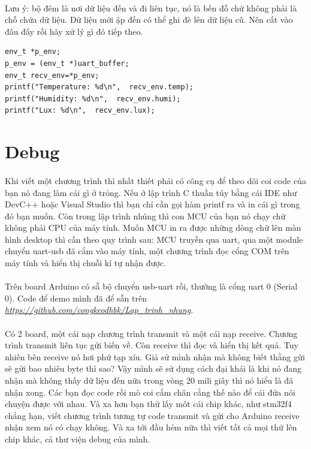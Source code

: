 \documentclass[12pt,a5paper]{book}
\begin{document}
\paragraph{}
Lưu ý: bộ đêm là nơi dữ liệu đến và đi liên tục, nó là bến đỗ chứ không phải là chỗ chứa dữ liệu. Dữ liệu mới ập đến có thể ghi đè lên dữ liệu cũ. Nên cất vào đâu đấy rồi hãy xử lý gì đó tiếp theo.
\begin{lstlisting}
env_t *p_env;
p_env = (env_t *)uart_buffer;
env_t recv_env=*p_env;
printf("Temperature: %d\n",  recv_env.temp);
printf("Humidity: %d\n",  recv_env.humi);
printf("Lux: %d\n",  recv_env.lux);
\end{lstlisting}
\section{Debug}
\paragraph{}
Khi viết một chương trình thì nhất thiết phải có công cụ để theo dõi coi code của bạn nó đang làm cái gì ở trỏng. Nếu ở lập trình C thuần túy bằng cái IDE như DevC++ hoặc Visual Studio thì bạn chỉ cần gọi hàm printf ra và in cái gì trong đó bạn muốn. Còn trong lập trình nhúng thì con MCU của bạn nó chạy chứ không phải CPU của máy tính. Muốn MCU in ra được những dòng chữ lên màn hình desktop thì cần theo quy trình sau: MCU truyền qua uart, qua một module chuyển uart-usb đã cắm vào máy tính, một chương trình đọc cổng COM trên máy tính và hiển thị chuỗi kí tự nhận được.
\paragraph{}
Trên board Arduino có sẵ bộ chuyển usb-uart rồi, thường là cổng uart 0 (Serial 0). Code để demo mình đã để sẵn trên \textit{\url{https://github.com/congkeodhbk/Lap_trinh_nhung}}. 
\paragraph{}
Có 2 board, một cái nạp chương trình transmit và một cái nạp receive. Chương trình transmit liên tục gửi biến về. Còn receive thì đọc và hiển thị kết quả. Tuy nhiên bên receive nó hơi phứ tạp xíu. Giả sử mình nhận mà không biết thằng gửi sẽ gửi bao nhiêu byte thì sao? Vậy mình sẽ sử dụng cách đại khái là khi nó đang nhận mà không thấy dữ liệu đến nữa trong vòng 20 mili giây thì nó hiểu là đã nhận xong. Các bạn đọc code rồi mò coi cắm chân cẳng thế nào để cái đứa nói chuyện được với nhau. Và xa hơn bạn thử lấy môt cái chip khác, như stm32f4 chẳng hạn, viết chương trình tương tự code transmit và gửi cho Arduino receive nhận xem nó có chạy không. Và xa tới đầu hẻm nữa thì viết tất cả mọi thứ lên chip khác, cả thư viện debug của mình.
\end{document}
